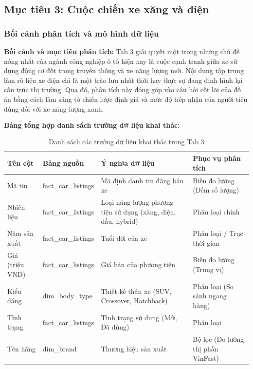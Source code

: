 \subsection{Mục tiêu 3: Cuộc chiến xe xăng và điện}
\label{subsec:tab3}

\subsubsection{Bối cảnh phân tích và mô hình dữ liệu}
\label{subsubsec:tab3_schema}

\noindent\textbf{Bối cảnh và mục tiêu phân tích:}
Tab 3 giải quyết một trong những chủ đề nóng nhất của ngành công nghiệp ô tô hiện nay là cuộc cạnh tranh giữa xe sử dụng động cơ đốt trong truyền thống và xe năng lượng mới. Nội dung tập trung làm rõ liệu xe điện chỉ là một trào lưu nhất thời hay thực sự đang định hình lại cấu trúc thị trường. Qua đó, phân tích này đóng góp vào câu hỏi cốt lõi của đồ án bằng cách làm sáng tỏ chiến lược định giá và mức độ tiếp nhận của người tiêu dùng đối với xe năng lượng xanh.

\noindent\textbf{Bảng tổng hợp danh sách trường dữ liệu khai thác:}
\begin{table}[H]
\centering
\small
\begin{tabularx}{\textwidth}{L{3cm} L{3.5cm} L{4.5cm} Y}
\hline
\textbf{Tên cột} & \textbf{Bảng nguồn} & \textbf{Ý nghĩa dữ liệu} & \textbf{Phục vụ phân tích} \\ \hline
Mã tin & fact\_car\_listings & Mã định danh tin đăng bán xe & Biến đo lường (Đếm số lượng) \\ \hline
Nhiên liệu & fact\_car\_listings & Loại năng lượng phương tiện sử dụng (xăng, điện, dầu, hybrid) & Phân loại chính \\ \hline
Năm sản xuất & fact\_car\_listings & Tuổi đời của xe & Phân loại / Trục thời gian \\ \hline
Giá (triệu VND) & fact\_car\_listings & Giá bán của phương tiện & Biến đo lường (Trung vị) \\ \hline
Kiểu dáng & dim\_body\_type & Thiết kế thân xe (SUV, Crossover, Hatchback) & Phân loại (So sánh ngang hàng) \\ \hline
Tình trạng & fact\_car\_listings & Tình trạng sử dụng (Mới, Đã dùng) & Phân loại \\ \hline
Tên hãng & dim\_brand & Thương hiệu sản xuất & Bộ lọc (Đo lường thị phần VinFast) \\ \hline
\end{tabularx}
\caption{Danh sách các trường dữ liệu khai thác trong Tab 3}
\label{tab:schema_tab3}
\end{table}



